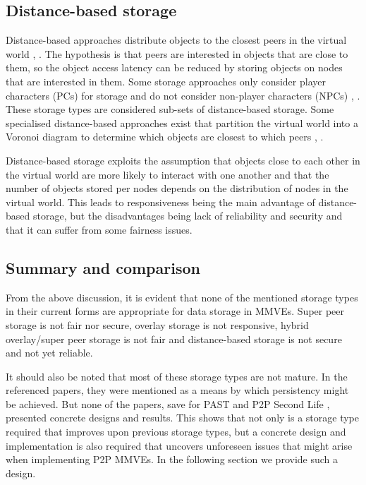 \documentclass[10pt,a4paper,conference]{IEEEtran}
\begin{document}
\subsection{Distance-based storage}
\label{classic_distance_based}

Distance-based approaches distribute objects to the closest peers in the virtual world \cite{colyseus_distance_based}, \cite{solipsis}. The
hypothesis is that peers are interested in objects that are close to them, so the object access latency can be reduced by storing objects on nodes
that are interested in them. Some storage approaches only consider player characters (PCs) for storage and do not consider non-player characters
(NPCs) \cite{individual_storage1}, \cite{cheat_proof_playout}. These storage types are considered sub-sets of distance-based storage. Some
specialised distance-based approaches exist that partition the virtual world into a Voronoi diagram to determine which objects are closest to which
peers \cite{Buyukkaya_voronoi_state_management}, \cite{Hu_voronoi_IM}.

Distance-based storage exploits the assumption that objects close to each other in the virtual world are more likely to interact with one another and
that the number of objects stored per nodes depends on the distribution of nodes in the virtual world. This leads to responsiveness being the main
advantage of distance-based storage, but the disadvantages being lack of reliability and security and that it can suffer from some fairness issues.

\subsection{Summary and comparison}

From the above discussion, it is evident that none of the mentioned storage types in their current forms are appropriate for data storage in MMVEs.
Super peer storage is not fair nor secure, overlay storage is not responsive, hybrid overlay/super peer storage is not fair and distance-based
storage is not secure and not yet reliable.

It should also be noted that most of these storage types are not mature. In the referenced papers, they were mentioned as a means by which
persistency might be achieved. But none of the papers, save for PAST \cite{storage_and_chaching_PAST} and P2P Second Life
\cite{varvello_p2p_second_life}, presented concrete designs and results. This shows that not only is a storage type required that improves upon
previous storage types, but a concrete design and implementation is also required that uncovers unforeseen issues that might arise when implementing
P2P MMVEs. In the following section we provide such a design.
\end{document}
